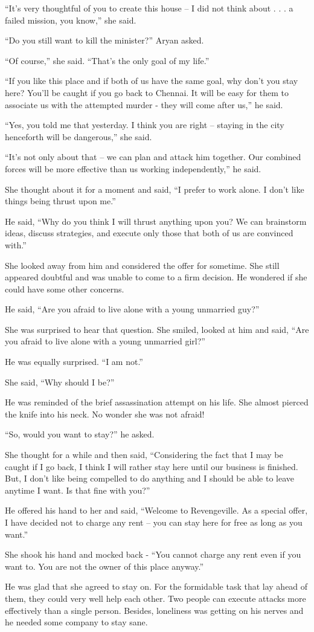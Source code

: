 “It's very thoughtful of you to create this house – I did not think about . . .
a failed mission, you know,” she said.

“Do you still want to kill the minister?” Aryan asked.

“Of course,” she said. “That's the only goal of my life.”

“If you like this place and if both of us have the same goal, why don't you stay
here? You'll be caught if you go back to Chennai. It will be easy for them to
associate us with the attempted murder - they will come after us,” he said.

“Yes, you told me that yesterday. I think you are right – staying in the city
henceforth will be dangerous,” she said.

“It's not only about that – we can plan and attack him together. Our combined
forces will be more effective than us working independently,” he said.

She thought about it for a moment and said, “I prefer to work alone. I don't
like things being thrust upon me.”

He said, “Why do you think I will thrust anything upon you? We can brainstorm
ideas, discuss strategies, and execute only those that both of us are convinced
with.”

She looked away from him and considered the offer for sometime. She still
appeared doubtful and was unable to come to a firm decision. He wondered if she
could have some other concerns.

He said, “Are you afraid to live alone with a young unmarried guy?”

She was surprised to hear that question. She smiled, looked at him and said,
“Are you afraid to live alone with a young unmarried girl?”

He was equally surprised. “I am not.”

She said, “Why should I be?”

He was reminded of the brief assassination attempt on his life. She almost
pierced the knife into his neck. No wonder she was not afraid!

“So, would you want to stay?” he asked.

She thought for a while and then said, “Considering the fact that I may be
caught if I go back, I think I will rather stay here until our business is
finished. But, I don't like being compelled to do anything and I should be able
to leave anytime I want. Is that fine with you?”

He offered his hand to her and said, “Welcome to Revengeville. As a special
offer, I have decided not to charge any rent – you can stay here for free as
long as you want.”

She shook his hand and mocked back - “You cannot charge any rent even if you
want to. You are not the owner of this place anyway.”

He was glad that she agreed to stay on. For the formidable task that lay ahead
of them, they could very well help each other. Two people can execute attacks
more effectively than a single person. Besides, loneliness was getting on his
nerves and he needed some company to stay sane.